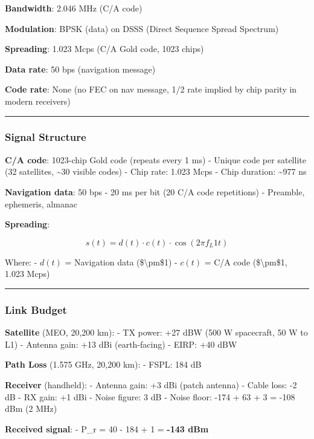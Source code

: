 \textbf{Bandwidth}: 2.046 MHz (C/A code)

\textbf{Modulation}: BPSK (data) on DSSS (Direct Sequence Spread
Spectrum)

\textbf{Spreading}: 1.023 Mcps (C/A Gold code, 1023 chips)

\textbf{Data rate}: 50 bps (navigation message)

\textbf{Code rate}: None (no FEC on nav message, 1/2 rate implied by
chip parity in modern receivers)

\begin{center}\rule{0.5\linewidth}{0.5pt}\end{center}

\subsubsection{Signal Structure}\label{signal-structure}

\textbf{C/A code}: 1023-chip Gold code (repeats every 1 ms) - Unique
code per satellite (32 satellites, \textasciitilde30 visible codes) -
Chip rate: 1.023 Mcps - Chip duration: \textasciitilde977 ns

\textbf{Navigation data}: 50 bps - 20 ms per bit (20 C/A code
repetitions) - Preamble, ephemeris, almanac

\textbf{Spreading}:

\[
s(t) = d(t) \cdot c(t) \cdot \cos(2\pi f_L1 t)
\]

Where: - \(d(t)\) = Navigation data (\$\textbackslash pm\$1) - \(c(t)\)
= C/A code (\$\textbackslash pm\$1, 1.023 Mcps)

\begin{center}\rule{0.5\linewidth}{0.5pt}\end{center}

\subsubsection{Link Budget}\label{link-budget}

\textbf{Satellite} (MEO, 20,200 km): - TX power: +27 dBW (500 W
spacecraft, 50 W to L1) - Antenna gain: +13 dBi (earth-facing) - EIRP:
+40 dBW

\textbf{Path Loss} (1.575 GHz, 20,200 km): - FSPL: 184 dB

\textbf{Receiver} (handheld): - Antenna gain: +3 dBi (patch antenna) -
Cable loss: -2 dB - RX gain: +1 dBi - Noise figure: 3 dB - Noise floor:
-174 + 63 + 3 = -108 dBm (2 MHz)

\textbf{Received signal}: - P\_r = 40 - 184 + 1 = \textbf{-143 dBm}

